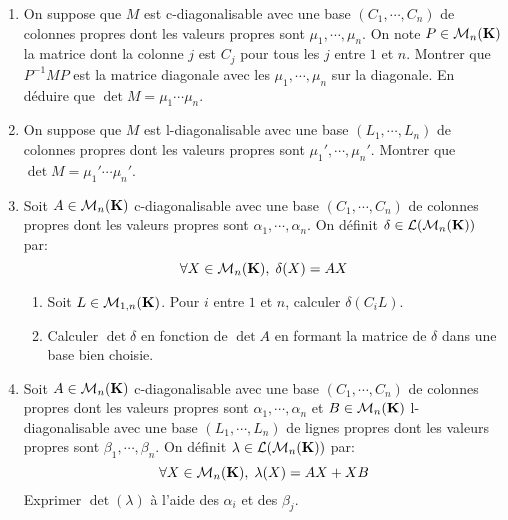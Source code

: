 \begin{enumerate}
 \item On suppose que $M$ est c-diagonalisable avec une base $(C_1,\cdots, C_n)$ de colonnes propres dont les valeurs propres sont $\mu_1,\cdots,\mu_n$. On note $P\in\mathcal{M}_n(\mathbf{K})$ la matrice dont la colonne $j$ est $C_j$ pour tous les $j$ entre $1$ et $n$. Montrer que $P^{-1}MP$ est la matrice diagonale avec les $\mu_1,\cdots,\mu_n$ sur la diagonale. En déduire que $\det M = \mu_1\cdots \mu_n$.

 \item On suppose que $M$ est l-diagonalisable avec une base $(L_1,\cdots, L_n)$ de colonnes propres dont les valeurs propres sont $\mu_1',\cdots,\mu_n'$. Montrer que $\det M = \mu_1'\cdots \mu_n'$.

 \item Soit $A\in\mathcal{M}_n(\mathbf{K})$ c-diagonalisable avec une base $(C_1,\cdots, C_n)$ de colonnes propres dont les valeurs propres sont $\alpha_1,\cdots,\alpha_n$. On définit  $\delta \in \mathcal{L}(\mathcal{M}_n(\mathbf{K}))$  par:
\begin{displaymath}
 \forall X\in \mathcal{M}_n(\mathbf{K}), \; \delta(X) = AX
\end{displaymath}
\begin{enumerate}
 \item Soit $L\in \mathcal{M}_{1,n}(\mathbf{K})$. Pour $i$ entre $1$ et $n$, calculer $\delta(C_iL)$.
 \item Calculer $\det \delta$ en fonction de $\det A$ en formant la matrice de $\delta$ dans une base bien choisie.
\end{enumerate}

\item Soit $A\in\mathcal{M}_n(\mathbf{K})$ c-diagonalisable avec une base $(C_1,\cdots, C_n)$ de colonnes propres dont les valeurs propres sont $\alpha_1,\cdots,\alpha_n$ et $B\in\mathcal{M}_n(\mathbf{K})$ l-diagonalisable avec une base $(L_1,\cdots, L_n)$ de lignes propres dont les valeurs propres sont $\beta_1,\cdots,\beta_n$. On définit  $\lambda \in \mathcal{L}(\mathcal{M}_n(\mathbf{K}))$  par:
\begin{displaymath}
 \forall X\in \mathcal{M}_n(\mathbf{K}), \; \lambda(X) = AX + XB
\end{displaymath}
Exprimer $\det(\lambda)$ à l'aide des $\alpha_i$ et des $\beta_j$.
\end{enumerate}
